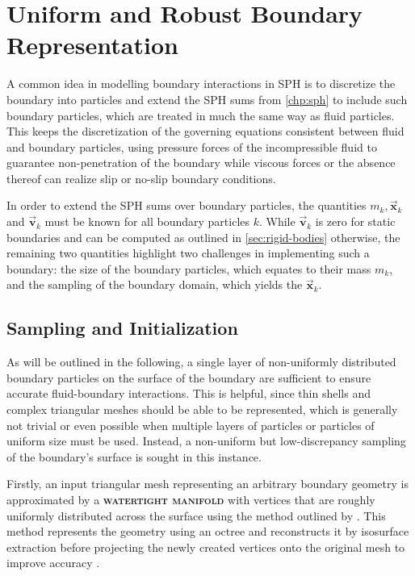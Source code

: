 \documentclass[oneside, a4paper]{book}
\newcommand\emphasis[1]{{\scshape\bfseries#1}}
\newcommand\vek[1]{\vec{\bm{#1}}}
\begin{document}
    \section{Uniform and Robust Boundary Representation}\label{sec:boundary}

    A common idea in modelling boundary interactions in SPH is to discretize the boundary into particles and extend the SPH sums from \autoref{chp:sph} to include such boundary particles, which are treated in much the same way as fluid particles. This keeps the discretization of the governing equations consistent between fluid and boundary particles, using pressure forces of the incompressible fluid to guarantee non-penetration of the boundary while viscous forces or the absence thereof can realize slip or no-slip boundary conditions. 

    In order to extend the SPH sums over boundary particles, the quantities $m_k, \vek{x}_k $ and $ \vek{v}_k$ must be known for all boundary particles $k$. While $\vek{v}_k$ is zero for static boundaries and can be computed as outlined in \autoref{sec:rigid-bodies} otherwise, the remaining two quantities highlight two challenges in implementing such a boundary: the size of the boundary particles, which equates to their mass $m_k$, and the sampling of the boundary domain, which yields the $\vek{x}_k$.

    \subsection{Sampling and Initialization}\label{subsec:sampling-the-boundary}
    As will be outlined in the following, a single layer of non-uniformly distributed boundary particles on the surface of the boundary are sufficient to ensure accurate fluid-boundary interactions. This is helpful, since thin shells and complex triangular meshes should be able to be represented, which is generally not trivial or even possible when multiple layers of particles or particles of uniform size must be used. Instead, a non-uniform but low-discrepancy sampling of the boundary's surface is sought in this instance.

    Firstly, an input triangular mesh representing an arbitrary boundary geometry is approximated by a \emphasis{watertight manifold} with vertices that are roughly uniformly distributed across the surface using the method outlined by \autocite[Huang et al.]{mesh-watertight-manifold}. This method represents the geometry using an octree and reconstructs it by isosurface extraction before projecting the newly created vertices onto the original mesh to improve accuracy \autocite{mesh-watertight-manifold}.
\end{document}

